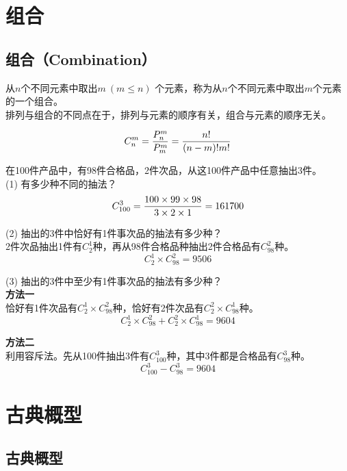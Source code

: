 \documentclass[12pt, openany, oneside]{book}
\begin{document}
\section{组合}

\subsection{组合（Combination）}

从$ n $个不同元素中取出$ m\ (m \le n) $ 个元素，称为从$ n $个不同元素中取出$ m $个元素的一个组合。 \\

排列与组合的不同点在于，排列与元素的顺序有关，组合与元素的顺序无关。

\vspace{-1cm}
\begin{align}
	C_n^m = {P_n^m \over P_m^m} = {n! \over (n-m)!m!}
\end{align}

\begin{tcolorbox}
	在100件产品中，有98件合格品，2件次品，从这100件产品中任意抽出3件。 \\
	(1) 有多少种不同的抽法？
	$$
		C_{100}^3 = {100 \times 99 \times 98 \over 3 \times 2 \times 1} = 161700
	$$

	(2) 抽出的3件中恰好有1件事次品的抽法有多少种？ \\
	2件次品抽出1件有$ C_2^1 $种，再从98件合格品种抽出2件合格品有$ C_{98}^2 $种。
	$$
		C_2^1 \times C_{98}^2 = 9506
	$$

	(3) 抽出的3件中至少有1件事次品的抽法有多少种？ \\
	\textbf{方法一} \\
	恰好有1件次品有$ C_2^1 \times C_{98}^2 $种，恰好有2件次品有$ C_2^2 \times C_{98}^1 $种。
	$$
		C_2^1 \times C_{98}^2 + C_2^2 \times C_{98}^1 = 9604
	$$

	\textbf{方法二} \\
	利用容斥法。先从100件抽出3件有$ C_{100}^3 $种，其中3件都是合格品有$ C_{98}^3 $种。
	$$
		C_{100}^3 - C_{98}^3 = 9604
	$$
\end{tcolorbox}

\newpage

\section{古典概型}

\subsection{古典概型}
\end{document}
